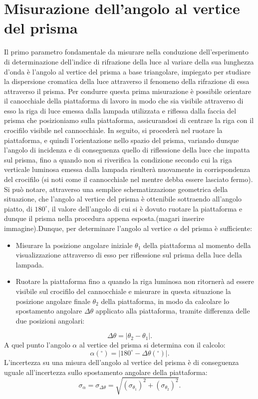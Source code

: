 \documentclass[a4paper,12pt]{article}
\begin{document}
\section{Misurazione dell’angolo al vertice del prisma}
\label{sec:angolo al vertice}
Il primo parametro fondamentale da misurare nella conduzione dell’esperimento di determinazione dell’indice di rifrazione della luce al variare della sua lunghezza d’onda è l’angolo al vertice del prisma a base triangolare, impiegato per studiare la dispersione cromatica della luce attraverso il fenomeno della rifrazione di essa attraverso il prisma. Per condurre questa prima misurazione è possibile orientare il canocchiale della piattaforma di lavoro in modo che sia visibile attraverso di esso la riga di luce emessa dalla lampada utilizzata e riflessa dalla faccia del prisma che posizioniamo sulla piattaforma, assicurandosi di centrare la riga con il crocifilo visibile nel cannocchiale. In seguito, si procederà nel ruotare la piattaforma, e quindi l’orientazione nello spazio del prisma, variando dunque l’angolo di incidenza e di conseguenza quello di riflessione della luce che impatta sul prisma, fino a quando non si riverifica la condizione secondo cui la riga verticale luminosa emessa dalla lampada risulterà nuovamente in corrispondenza del crocifilo (si noti come il cannocchiale nel mentre debba essere lasciato fermo). Si può notare, attraverso una semplice schematizzazione geometrica della situazione, che l’angolo al vertice del prisma è ottenibile sottraendo all’angolo piatto, di \( 180^\circ \), il valore dell’angolo di cui si è dovuto ruotare la piattaforma e dunque il prisma nella procedura appena esposta.(magari inserire immagine).Dunque, per determinare l’angolo al vertice \( \alpha \) del prisma è sufficiente:
\begin{itemize}
    \item Misurare la posizione angolare iniziale \( \theta_1 \) della piattaforma al momento della visualizzazione attraverso di esso per riflessione sul prisma della luce della lampada.
    \item Ruotare la piattaforma fino a quando la riga luminosa non ritornerà ad essere visibile sul crocifilo del cannocchiale e misurare in questa situazione la posizione angolare finale \( \theta_2 \) della piattaforma, in modo da calcolare lo spostamento angolare \( \Delta\theta \) applicato alla piattaforma, tramite differenza delle due posizioni angolari:
\end{itemize}
\[
\Delta\theta = |\theta_2 - \theta_1|.
\]
A quel punto l’angolo \( \alpha \) al vertice del prisma si determina con il calcolo:
\[
\alpha(^\circ) = |180^\circ - \Delta\theta(^\circ)|.
\]
L’incertezza su una misura dell’angolo al vertice del prisma è di conseguenza uguale all’incertezza sullo spostamento angolare della piattaforma:
\[
\sigma_\alpha = \sigma_{\Delta\theta} = \sqrt{(\sigma_{\theta_1})^2 + (\sigma_{\theta_2})^2}.
\]
\end{document}
